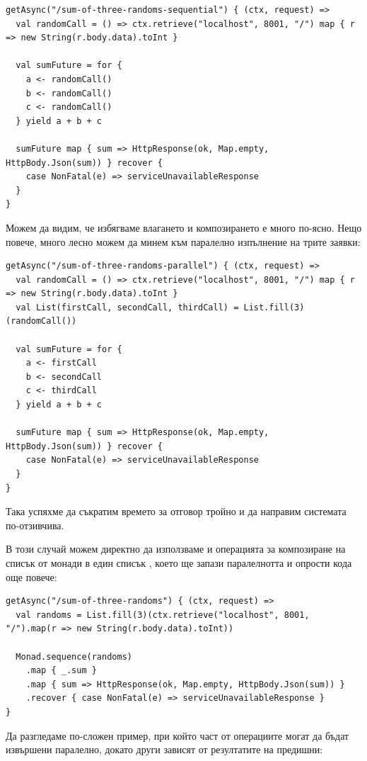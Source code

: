 \begin{lstlisting}
getAsync("/sum-of-three-randoms-sequential") { (ctx, request) =>
  val randomCall = () => ctx.retrieve("localhost", 8001, "/") map { r => new String(r.body.data).toInt }
  
  val sumFuture = for {
    a <- randomCall()
    b <- randomCall()
    c <- randomCall()
  } yield a + b + c
  
  sumFuture map { sum => HttpResponse(ok, Map.empty, HttpBody.Json(sum)) } recover {
    case NonFatal(e) => serviceUnavailableResponse
  }
}
\end{lstlisting}

Можем да видим, че избягваме влагането и композирането е много по-ясно. Нещо повече, много лесно можем да минем към паралелно изпълнение на трите заявки:

\begin{lstlisting}
getAsync("/sum-of-three-randoms-parallel") { (ctx, request) =>
  val randomCall = () => ctx.retrieve("localhost", 8001, "/") map { r => new String(r.body.data).toInt }
  val List(firstCall, secondCall, thirdCall) = List.fill(3)(randomCall())
  
  val sumFuture = for {
    a <- firstCall
    b <- secondCall
    c <- thirdCall
  } yield a + b + c
    
  sumFuture map { sum => HttpResponse(ok, Map.empty, HttpBody.Json(sum)) } recover {
    case NonFatal(e) => serviceUnavailableResponse
  }
}
\end{lstlisting}

Така успяхме да съкратим времето за отговор тройно и да направим системата по-отзивчива.

В този случай можем директно да използваме и операцията за композиране на списък от монади в един списък , което ще запази паралелнотта и опрости кода още повече:

\begin{lstlisting}
getAsync("/sum-of-three-randoms") { (ctx, request) =>
  val randoms = List.fill(3)(ctx.retrieve("localhost", 8001, "/").map(r => new String(r.body.data).toInt))
  
  Monad.sequence(randoms)
    .map { _.sum }
    .map { sum => HttpResponse(ok, Map.empty, HttpBody.Json(sum)) }
    .recover { case NonFatal(e) => serviceUnavailableResponse }
}
\end{lstlisting}

Да разгледаме по-сложен пример, при който част от операциите могат да бъдат извършени паралелно, докато други зависят от резултатите на предишни:


